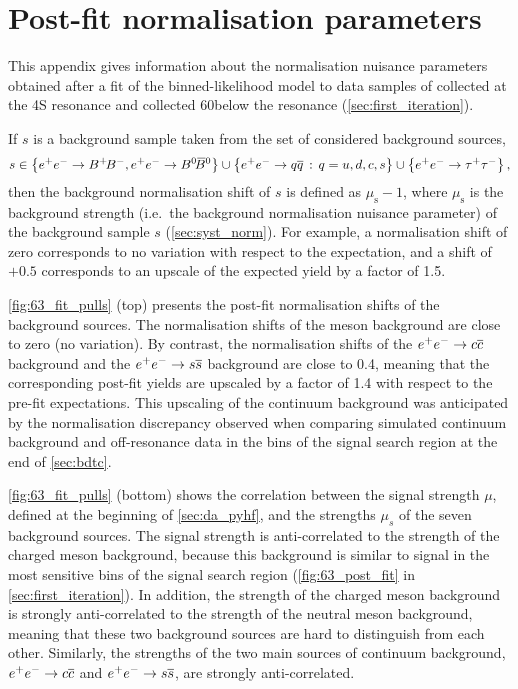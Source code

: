 \clearpage
\section{Post-fit normalisation parameters} \label{sec:pulls}
This appendix gives information about the normalisation nuisance parameters obtained after a fit of the binned-likelihood model to data samples of \lumionpartial collected at the \Y4S resonance and \lumioffpartial collected 60\mev below the resonance (\cref{sec:first_iteration}).

If $s$ is a background sample taken from the set of considered background sources,
\begin{equation*}
s\in\left\{\epem\to\BpBm,\epem\to\BzBzb\right\}\cup\left\{\epem\to\qqbar\,:\,q=u,d,c,s\right\}\cup\left\{\epem\to\tautau\right\},
\end{equation*}
then the background normalisation shift of $s$ is defined as $\mu_{\mathrm{s}}-1$,
where $\mu_{\mathrm{s}}$ is the background strength (i.e.~the background normalisation nuisance parameter) of the background sample $s$ (\cref{sec:syst_norm}).
For example, a normalisation shift of zero corresponds to no variation with respect to the expectation, and a shift of $+0.5$ corresponds to an upscale of the expected yield by a factor of 1.5.

\cref{fig:63_fit_pulls} (top) presents the post-fit normalisation shifts of the background sources.
The normalisation shifts of the \B meson background are close to zero (no variation).
By contrast, the normalisation shifts of the $e^+e^-\rightarrow c\overline c$ background and the $e^+e^-\rightarrow s\overline s$ background are close to 0.4, meaning that the corresponding post-fit yields are upscaled by a factor of 1.4 with respect to the pre-fit expectations.
This upscaling of the continuum background was anticipated by the normalisation discrepancy observed when comparing simulated continuum background and off-resonance data in the bins of the signal search region at the end of \cref{sec:bdtc}.

\cref{fig:63_fit_pulls} (bottom) shows the correlation between the signal strength $\mu$, defined at the beginning of \cref{sec:da_pyhf}, and the strengths $\mu_s$ of the seven background sources.
The signal strength is anti-correlated to the strength of the charged \B meson background, because this background is similar to signal in the most sensitive bins of the signal search region (\cref{fig:63_post_fit} in \cref{sec:first_iteration}).
In addition, the strength of the charged \B meson background is strongly anti-correlated to the strength of the neutral \B meson background, meaning that these two background sources are hard to distinguish from each other.
Similarly, the strengths of the two main sources of continuum background, $e^+e^-\rightarrow c\overline c$ and $e^+e^-\rightarrow s\overline s$, are strongly anti-correlated.

